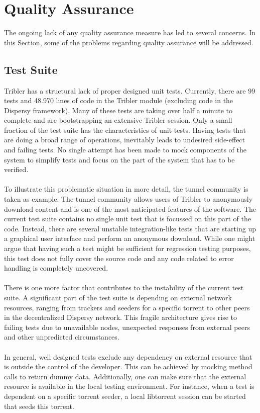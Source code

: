 \section{Quality Assurance}
The ongoing lack of any quality assurance measure has led to several concerns. In this Section, some of the problems regarding quality assurance will be addressed.

\subsection{Test Suite}
Tribler has a structural lack of proper designed unit tests. Currently, there are 99 tests and 48.970 lines of code in the Tribler module (excluding code in the Dispersy framework). Many of these tests are taking over half a minute to complete and are bootstrapping an extensive Tribler session. Only a small fraction of the test suite has the characteristics of unit tests. Having tests that are doing a broad range of operations, inevitably leads to undesired side-effect and failing tests. No single attempt has been made to mock components of the system to simplify tests and focus on the part of the system that has to be verified.\\\\
To illustrate this problematic situation in more detail, the tunnel community is taken as example. The tunnel community allows users of Tribler to anonymously download content and is one of the most anticipated features of the software. The current test suite contains no single unit test that is focussed on this part of the code. Instead, there are several unstable integration-like tests that are starting up a graphical user interface and perform an anonymous download. While one might argue that having such a test might be sufficient for regression testing purposes, this test does not fully cover the source code and any code related to error handling is completely uncovered.\\\\
There is one more factor that contributes to the instability of the current test suite. A significant part of the test suite is depending on external network resources, ranging from trackers and seeders for a specific torrent to other peers in the decentralized Dispersy network. This fragile architecture gives rise to failing tests due to unavailable nodes, unexpected responses from external peers and other unpredicted circumstances.\\\\
In general, well designed tests exclude any dependency on external resource that is outside the control of the developer. This can be achieved by mocking method calls to return dummy data. Additionally, one can make sure that the external resource is available in the local testing environment. For instance, when a test is dependent on a specific torrent seeder, a local libtorrent session can be started that seeds this torrent.

